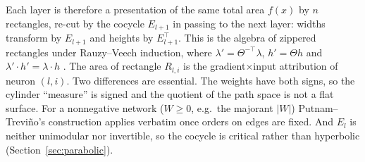 Each layer is therefore a presentation of the same total area $f(x)$ by $n$ rectangles, re-cut by the cocycle $E_{l+1}$ in passing to the
next layer: widths transform by $E_{l+1}$ and heights by $E_{l+1}^{\top}$. This is the algebra of zippered rectangles under Rauzy--Veech
induction, where $\lambda'=\Theta^{-\top}\lambda$, $h'=\Theta h$ and $\lambda'\cdot h'=\lambda\cdot h$ \cite[\S12.2]{PT}. The area of rectangle
$R_{l,i}$ is the gradient$\times$input attribution of neuron $(l,i)$. Two differences are essential. The weights have both signs, so
the cylinder ``measure'' is signed and the quotient of the path space is not a flat surface. For a nonnegative network ($W\ge0$, e.g.\
the majorant $|W|$) Putnam--Trevi\~no's construction applies verbatim once orders on edges are fixed. And $E_l$ is neither unimodular nor
invertible, so the cocycle is critical rather than hyperbolic (Section~\ref{sec:parabolic}).

